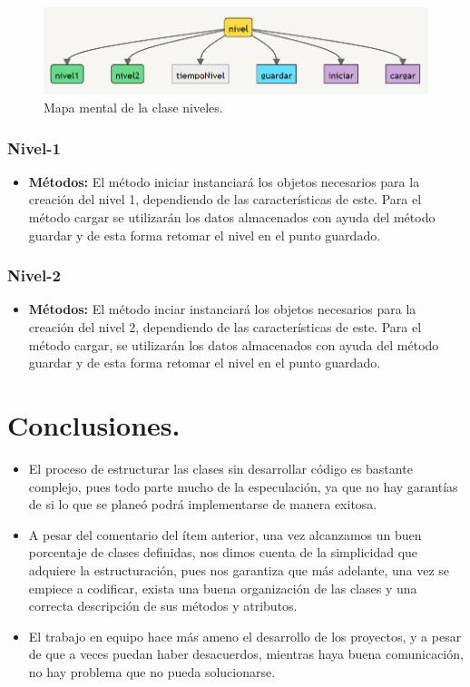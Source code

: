 \documentclass{article}
\begin{document}
\begin{figure}[h]
\includegraphics[scale=0.8]{Images/niveles.png}
\centering
\caption{Mapa mental de la clase niveles.}
\label{fig:mmniveles}
\end{figure}

    \subsubsection{Nivel-1}
    \begin{itemize}
        \item \textbf{Métodos:} El método iniciar instanciará los objetos necesarios para la creación del nivel 1, dependiendo de las características de este. Para el método cargar se utilizarán los datos almacenados con ayuda del método guardar y de esta forma retomar el nivel en el punto guardado.
    \end{itemize} 
    
    \subsubsection{Nivel-2}
    \begin{itemize}
        \item \textbf{Métodos:} El método inciar instanciará los objetos necesarios para la creación del nivel 2, dependiendo de las características de este. Para el método cargar, se utilizarán los datos almacenados con ayuda del método guardar y de esta forma retomar el nivel en el punto guardado.
    \end{itemize}
    

\section{Conclusiones.}
    \begin{itemize}
        \item El proceso de estructurar las clases sin desarrollar código es bastante complejo, pues todo parte mucho de la especulación, ya que no hay garantías de si lo que se planeó podrá implementarse de manera exitosa.
        
        \item A pesar del comentario del ítem anterior, una vez alcanzamos un buen porcentaje de clases definidas, nos dimos cuenta de la simplicidad que adquiere la estructuración, pues nos garantiza que más adelante, una vez se empiece a codificar, exista una buena organización de las clases y una correcta descripción de sus métodos y atributos.
        
        \item El trabajo en equipo hace más ameno el desarrollo de los proyectos, y a pesar de que a veces puedan haber desacuerdos, mientras haya buena comunicación, no hay problema que no pueda solucionarse.
    \end{itemize}
\end{document}

